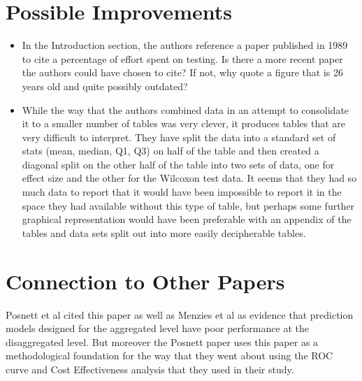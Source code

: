 \documentclass[english]{article}
\begin{document}
\section*{Possible Improvements}
\begin{itemize}
\item In the Introduction section, the authors reference a paper published
in 1989 to cite a percentage of effort spent on testing. Is there
a more recent paper the authors could have chosen to cite? If not,
why quote a figure that is 26 years old and quite possibly outdated?
\item While the way that the authors combined data in an attempt to consolidate
it to a smaller number of tables was very clever, it produces tables
that are very difficult to interpret. They have split the data into
a standard set of stats (mean, median, Q1, Q3) on half of the table
and then created a diagonal split on the other half of the table into
two sets of data, one for effect size and the other for the Wilcoxon
test data. It seems that they had so much data to report that it would
have been impossible to report it in the space they had available
without this type of table, but perhaps some further graphical representation
would have been preferable with an appendix of the tables and data
sets split out into more easily decipherable tables.
\end{itemize}

\section*{Connection to Other Papers}

Posnett et al \cite{posnett11} cited this paper as well as Menzies
et al \cite{menzies10} as evidence that prediction models designed
for the aggregated level have poor performance at the disaggregated
level. But moreover the Posnett paper uses this paper as a methodological
foundation for the way that they went about using the ROC curve and
Cost Effectiveness analysis that they used in their study.



{} 
\end{document}
